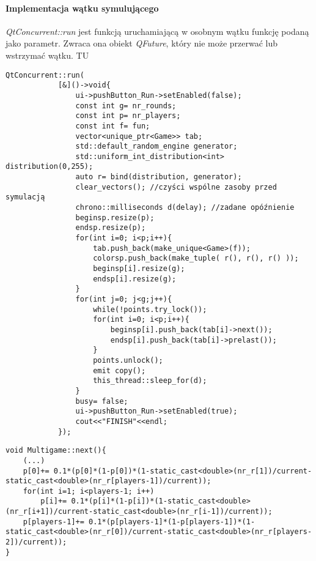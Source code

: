 \paragraph{Implementacja wątku symulującego} \textit{QtConcurrent::run} jest funkcją uruchamiającą w osobnym wątku funkcję podaną jako parametr. Zwraca ona obiekt \textit{QFuture}, który nie może przerwać lub wstrzymać wątku. {\color{red} TU}
\begin{lstlisting}
QtConcurrent::run(
            [&]()->void{
                ui->pushButton_Run->setEnabled(false);
                const int g= nr_rounds;
                const int p= nr_players;
                const int f= fun;
                vector<unique_ptr<Game>> tab;
                std::default_random_engine generator;
                std::uniform_int_distribution<int> distribution(0,255);
                auto r= bind(distribution, generator);
                clear_vectors(); //czyści wspólne zasoby przed symulacją
                chrono::milliseconds d(delay); //zadane opóźnienie
                beginsp.resize(p);
                endsp.resize(p);
                for(int i=0; i<p;i++){
                    tab.push_back(make_unique<Game>(f));
                    colorsp.push_back(make_tuple( r(), r(), r() ));
                    beginsp[i].resize(g);
                    endsp[i].resize(g);
                }
                for(int j=0; j<g;j++){
                    while(!points.try_lock());
                    for(int i=0; i<p;i++){
                        beginsp[i].push_back(tab[i]->next());
                        endsp[i].push_back(tab[i]->prelast());
                    }
                    points.unlock();
                    emit copy();
                    this_thread::sleep_for(d);
                }
                busy= false;
                ui->pushButton_Run->setEnabled(true);
                cout<<"FINISH"<<endl;
            });
\end{lstlisting}


\begin{lstlisting}
void Multigame::next(){
    (...)
    p[0]+= 0.1*(p[0]*(1-p[0])*(1-static_cast<double>(nr_r[1])/current-static_cast<double>(nr_r[players-1])/current));
    for(int i=1; i<players-1; i++)
        p[i]+= 0.1*(p[i]*(1-p[i])*(1-static_cast<double>(nr_r[i+1])/current-static_cast<double>(nr_r[i-1])/current));
    p[players-1]+= 0.1*(p[players-1]*(1-p[players-1])*(1-static_cast<double>(nr_r[0])/current-static_cast<double>(nr_r[players-2])/current));
}
\end{lstlisting}

